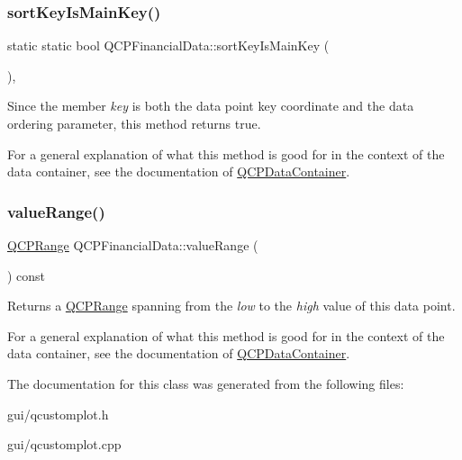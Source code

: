 \subsubsection{\texorpdfstring{sort\+Key\+Is\+Main\+Key()}{sortKeyIsMainKey()}}
{\footnotesize\ttfamily static static bool Q\+C\+P\+Financial\+Data\+::sort\+Key\+Is\+Main\+Key (\begin{DoxyParamCaption}{ }\end{DoxyParamCaption})\hspace{0.3cm}{\ttfamily [inline]}, {\ttfamily [static]}}

Since the member {\itshape key} is both the data point key coordinate and the data ordering parameter, this method returns true.

For a general explanation of what this method is good for in the context of the data container, see the documentation of \hyperlink{classQCPDataContainer}{Q\+C\+P\+Data\+Container}. \mbox{\label{classQCPFinancialData_a164d5584eeeb9ba48b4b595ac2ac7fcf}} 
\subsubsection{\texorpdfstring{value\+Range()}{valueRange()}}
{\footnotesize\ttfamily \hyperlink{classQCPRange}{Q\+C\+P\+Range} Q\+C\+P\+Financial\+Data\+::value\+Range (\begin{DoxyParamCaption}{ }\end{DoxyParamCaption}) const\hspace{0.3cm}{\ttfamily [inline]}}

Returns a \hyperlink{classQCPRange}{Q\+C\+P\+Range} spanning from the {\itshape low} to the {\itshape high} value of this data point.

For a general explanation of what this method is good for in the context of the data container, see the documentation of \hyperlink{classQCPDataContainer}{Q\+C\+P\+Data\+Container}. 

The documentation for this class was generated from the following files\+:\begin{DoxyCompactItemize}
\item 
gui/qcustomplot.\+h\item 
gui/qcustomplot.\+cpp\end{DoxyCompactItemize}
